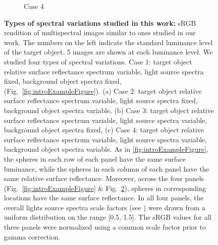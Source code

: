 \documentclass{jov}
\begin{document}
\begin{figure}
\begin{subfigure}[b]{0.33 \textwidth}
        \caption{Case 4}
        \label{fig:allSpectraVarying}
    \end{subfigure}    
    \caption{{\bf Types of spectral variations studied in this work:} sRGB rendition of multispectral images similar to ones studied in our work. The numbers on the left indicate the standard luminance level of the target object. 5 images are shown at each luminance level. We studied four types of spectral variations. Case 1: target object relative surface reflectance spectrum variable, light source spectra fixed, background object spectra fixed, (Fig.~\ref{fig:introExampleFigure}). (a) Case 2: target object relative surface reflectance spectrum variable, light source spectra fixed, background object spectra variable, (b) Case 3: target object relative surface reflectance spectrum variable, light source spectra variable, background object spectra fixed, (c) Case 4: target object relative surface reflectance spectrum variable, light source spectra variable, background object spectra variable. As in \ref{fig:introExampleFigure}, the spheres in each row of each panel have the same surface luminance, while the spheres in each column of each panel have the same relative surface reflectance.  Moreover, across the four panels (Fig.~\ref{fig:introExampleFigure} \& Fig.~\ref{fig:studiedCases}), spheres in corresponding locations have the same surface reflectance. In all four panels, the overall lights source spectra scale factors (see ) were drawn from a uniform distribution on the range [0.5, 1.5]. The sRGB values for all three panels were normalized using a common scale factor prior to gamma correction.} 
\label{fig:studiedCases}
\end{figure}
\end{document}
